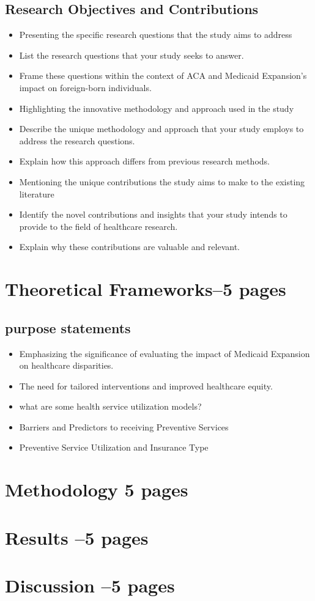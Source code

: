 \documentclass[10pt, oneside]{article}
\begin{document}
\subsection{Research Objectives and Contributions}

\begin{itemize}
\item Presenting the specific research questions that the study aims to address
\item List the research questions that your study seeks to answer.
\item Frame these questions within the context of ACA and Medicaid Expansion's impact on foreign-born individuals.
\item Highlighting the innovative methodology and approach used in the study
\item Describe the unique methodology and approach that your study employs to address the research questions.
\item Explain how this approach differs from previous research methods.
\item Mentioning the unique contributions the study aims to make to the existing literature
\item Identify the novel contributions and insights that your study intends to provide to the field of healthcare research.
\item Explain why these contributions are valuable and relevant.

\end{itemize}



\section{Theoretical Frameworks--5 pages}

\subsection{purpose statements}
\begin{itemize}
\item Emphasizing the significance of evaluating the impact of Medicaid Expansion on healthcare disparities.
\item The need for tailored interventions and improved healthcare equity.
\end{itemize}

\begin{itemize}
    \item what are some health service utilization models?
    \item Barriers and Predictors to receiving Preventive Services
\item Preventive Service Utilization and Insurance Type
\end{itemize}

\section{Methodology 5 pages}

\section{Results --5 pages}

\section{Discussion --5 pages}
\end{document}
